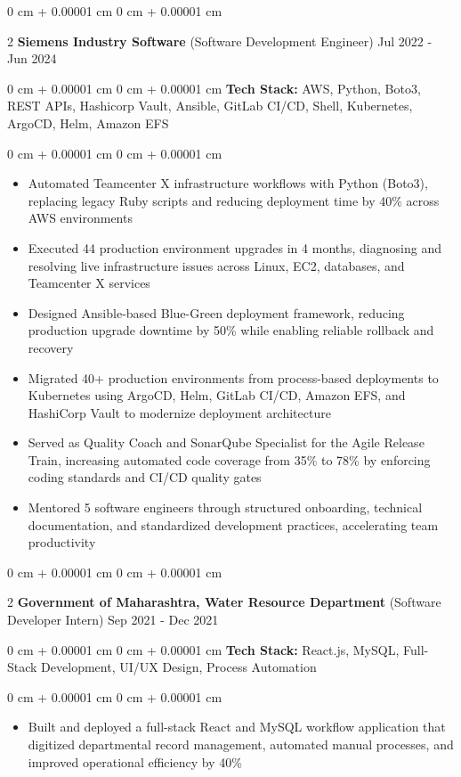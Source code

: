 \documentclass[9pt, letterpaper]{article}
\newenvironment{highlights}{
    \begin{itemize}[
        topsep=0.05 cm,
        parsep=0 pt,
        partopsep=0pt,
        itemsep=0pt,
        leftmargin=10pt
    ]
}{
    \end{itemize}
} %
\newenvironment{onecolentry}{
    \begin{adjustwidth}{
        0 cm + 0.00001 cm}{
        0 cm + 0.00001 cm}
}{
    \end{adjustwidth}
} %
\newenvironment{twocolentry}[2][]{
    \onecolentry
    \def\secondColumn{#2}
    \setcolumnwidth{\fill, 4.5 cm}
    \begin{paracol}{2}
}{
    \switchcolumn \raggedleft \secondColumn
    \end{paracol}
    \endonecolentry
} %
\begin{document}
    \begin{twocolentry}{Jul 2022 - Jun 2024}\textbf{Siemens Industry Software} (Software Development Engineer)\end{twocolentry}
    \begin{onecolentry}\textbf{Tech Stack:} AWS, Python, Boto3, REST APIs, Hashicorp Vault, Ansible, GitLab CI/CD, Shell, Kubernetes, ArgoCD, Helm, Amazon EFS \end{onecolentry}
    \begin{onecolentry}
        \begin{highlights}
            \item Automated Teamcenter X infrastructure workflows with Python (Boto3), replacing legacy Ruby scripts and reducing deployment time by 40\% across AWS environments
            \item Executed 44 production environment upgrades in 4 months, diagnosing and resolving live infrastructure issues across Linux, EC2, databases, and Teamcenter X services
            \item Designed Ansible-based Blue-Green deployment framework, reducing production upgrade downtime by 50\% while enabling reliable rollback and recovery
            \item Migrated 40+ production environments from process-based deployments to Kubernetes using ArgoCD, Helm, GitLab CI/CD, Amazon EFS, and HashiCorp Vault to modernize deployment architecture
            \item Served as Quality Coach and SonarQube Specialist for the Agile Release Train, increasing automated code coverage from 35\% to 78\% by enforcing coding standards and CI/CD quality gates
            \item Mentored 5 software engineers through structured onboarding, technical documentation, and standardized development practices, accelerating team productivity
        \end{highlights}
    \end{onecolentry}
    \vspace{0.04 cm}

    \begin{twocolentry}{Sep 2021 - Dec 2021}\textbf{Government of Maharashtra, Water Resource Department} (Software Developer Intern)\end{twocolentry}
    \begin{onecolentry}\textbf{Tech Stack:} React.js, MySQL, Full-Stack Development, UI/UX Design, Process Automation \end{onecolentry}
    \begin{onecolentry}
        \begin{highlights}
            \item Built and deployed a full-stack React and MySQL workflow application that digitized departmental record management, automated manual processes, and improved operational efficiency by 40\%
        \end{highlights}
    \end{onecolentry}
\end{document}
